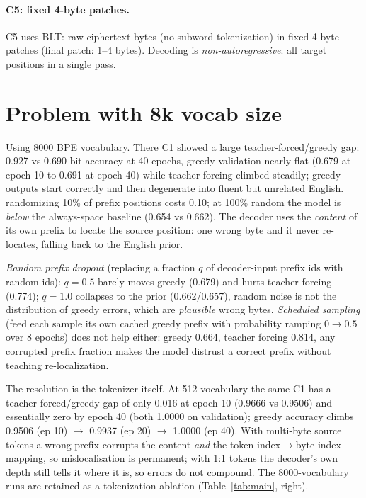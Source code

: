 \documentclass[12pt]{article}
\begin{document}
\paragraph{C5: fixed 4-byte patches.}
C5 uses BLT: raw ciphertext bytes (no subword tokenization) in
fixed 4-byte patches (final patch: 1--4 bytes). Decoding is
\emph{non-autoregressive}: all target positions in a single pass.

\section{Problem with 8k vocab size}
\label{sec:exposure}
Using 8000 BPE vocabulary. There C1 showed a
large teacher-forced/greedy gap: 0.927 vs 0.690 bit accuracy at 40 epochs, greedy
validation nearly flat (0.679 at epoch 10 to 0.691 at epoch 40) while teacher
forcing climbed steadily; greedy outputs start correctly and then degenerate
into fluent but unrelated English. randomizing
10\% of prefix positions costs 0.10; at 100\% random the model is \emph{below} the
always-space baseline (0.654 vs 0.662). The decoder uses the \emph{content} of
its own prefix to locate the source position: one wrong byte and it never
re-locates, falling back to the English prior.

\emph{Random prefix dropout} (replacing a fraction $q$
of decoder-input prefix ids with random ids): $q{=}0.5$ barely moves greedy
(0.679) and hurts teacher forcing (0.774); $q{=}1.0$ collapses to the prior
(0.662/0.657), random noise is not the distribution of greedy errors, which
are \emph{plausible} wrong bytes. \emph{Scheduled sampling} (feed each sample its
own cached greedy prefix with probability ramping $0\to0.5$ over 8 epochs) does
not help either: greedy 0.664, teacher forcing 0.814, any corrupted prefix
fraction makes the model distrust a correct prefix without teaching
re-localization.

The resolution is the tokenizer itself. At 512 vocabulary the same C1 has a
teacher-forced/greedy gap of only 0.016 at epoch 10 (0.9666 vs 0.9506) and
essentially zero by epoch 40 (both 1.0000 on validation); greedy accuracy climbs
0.9506 (ep 10) $\to$ 0.9937 (ep 20) $\to$ 1.0000 (ep 40). With multi-byte source
tokens a wrong prefix corrupts the content \emph{and} the token-index$\to$byte-index
mapping, so mislocalisation is permanent; with 1:1 tokens the decoder's own depth
still tells it where it is, so errors do not compound. The 8000-vocabulary runs
are retained as a tokenization ablation (Table~\ref{tab:main}, right).
\end{document}
